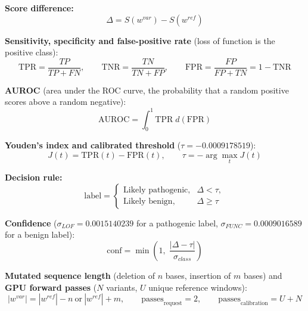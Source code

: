 \textbf{Score difference:}
\begin{equation}\Delta=S(w^{var})-S(w^{ref})\end{equation}

\textbf{Sensitivity, specificity and false-positive rate} (loss of function is the positive class):
\begin{equation}\mathrm{TPR}=\frac{TP}{TP+FN},\qquad \mathrm{TNR}=\frac{TN}{TN+FP},\qquad \mathrm{FPR}=\frac{FP}{FP+TN}=1-\mathrm{TNR}\end{equation}

\textbf{AUROC} (area under the ROC curve, the probability that a random positive scores above a random negative):
\begin{equation}\mathrm{AUROC}=\int_0^1\mathrm{TPR}\;d(\mathrm{FPR})\end{equation}

\textbf{Youden's index and calibrated threshold} ($\tau=-0.0009178519$):
\begin{equation}J(t)=\mathrm{TPR}(t)-\mathrm{FPR}(t),\qquad \tau=-\arg\max_t J(t)\end{equation}

\textbf{Decision rule:}
\begin{equation}\text{label}=\begin{cases}\text{Likely pathogenic}, & \Delta<\tau,\\ \text{Likely benign}, & \Delta\ge\tau\end{cases}\end{equation}

\textbf{Confidence} ($\sigma_{LOF}=0.0015140239$ for a pathogenic label, $\sigma_{FUNC}=0.0009016589$ for a benign label):
\begin{equation}\mathrm{conf}=\min\!\left(1,\;\frac{|\Delta-\tau|}{\sigma_{class}}\right)\end{equation}

\textbf{Mutated sequence length} (deletion of $n$ bases, insertion of $m$ bases) and \textbf{GPU forward passes} ($N$ variants, $U$ unique reference windows):
\begin{equation}|w^{var}|=|w^{ref}|-n\ \text{or}\ |w^{ref}|+m,\qquad \text{passes}_{\text{request}}=2,\qquad \text{passes}_{\text{calibration}}=U+N\end{equation}
\endgroup
\clearpage
\label{s:app:end}
